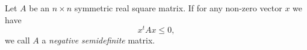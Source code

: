 \documentclass{article}
\begin{document}
Let $A$ be an $n\times n$ symmetric real square matrix. If for any non-zero vector $x$ we have
$$x^t Ax\leq0,$$
we call $A$ a \emph{negative semidefinite} matrix.
\end{document}
